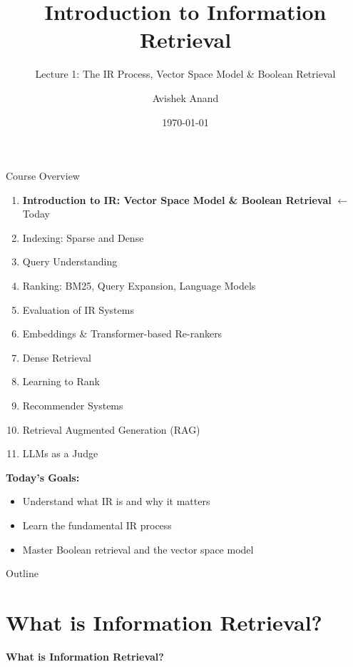 \documentclass[aspectratio=169]{beamer}
\title[Introduction to IR]{Introduction to Information Retrieval}
\subtitle{Lecture 1: The IR Process, Vector Space Model \& Boolean Retrieval}
\author{Avishek Anand}
\institute{Information Retrieval}
\date{\today}
\newif\ifanimated
\newcommand{\cpause}{\ifanimated\pause\fi}
\begin{document}
\begin{frame}
\titlepage
\end{frame}

\begin{frame}{Course Overview}
\begin{enumerate}
    \item \textbf{Introduction to IR: Vector Space Model \& Boolean Retrieval} $\leftarrow$ Today
    \item Indexing: Sparse and Dense
    \item Query Understanding
    \item Ranking: BM25, Query Expansion, Language Models
    \item Evaluation of IR Systems
    \item Embeddings \& Transformer-based Re-rankers
    \item Dense Retrieval
    \item Learning to Rank
    \item Recommender Systems
    \item Retrieval Augmented Generation (RAG)
    \item LLMs as a Judge
\end{enumerate}
\cpause
\vspace{1em}
\textbf{Today's Goals:}
\begin{itemize}
    \item Understand what IR is and why it matters
    \item Learn the fundamental IR process
    \item Master Boolean retrieval and the vector space model
\end{itemize}
\end{frame}

\begin{frame}{Outline}
\tableofcontents
\end{frame}

\section{What is Information Retrieval?}
\begin{frame}
  \centering
  \LARGE \textbf{What is Information Retrieval?}
\end{frame}
\end{document}
